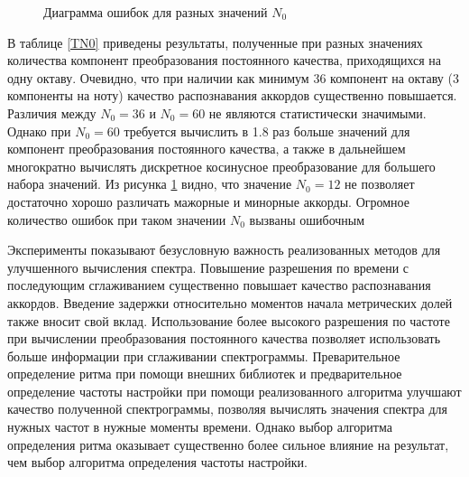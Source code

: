 \begin{figure}[h]
  \begin{minipage}[h]{0.49\linewidth}
  \end{minipage}
  \hfill
  \begin{minipage}[h]{0.49\linewidth}
  \end{minipage}
  \hfill
  \begin{minipage}[h]{0.49\linewidth}
  \end{minipage}
  \hfill
  \begin{minipage}[h]{0.49\linewidth}
  \end{minipage}
  \caption{Диаграмма ошибок для разных значений $N_0$}
  \label{img:n0}
\end{figure}

В таблице \ref{TN0} приведены результаты, полученные при разных значениях
количества компонент преобразования постоянного качества, приходящихся на одну
октаву. Очевидно, что при наличии как минимум 36 компонент на октаву (3
компоненты на ноту) качество распознавания аккордов существенно повышается.
Различия между $N_0=36$ и $N_0=60$ не являются статистически значимыми. Однако
при $N_0=60$ требуется вычислить в 1.8 раз больше значений для компонент
преобразования постоянного качества, а также в дальнейшем многократно вычислять
дискретное косинусное преобразование для большего набора значений. Из рисунка
\ref{img:n0} видно, что значение $N_0=12$ не позволяет достаточно хорошо
различать мажорные и минорные аккорды. Огромное количество ошибок при таком
значении $N_0$ вызваны ошибочным 

\medskip

Эксперименты показывают безусловную важность реализованных методов для
улучшенного вычисления спектра. Повышение разрешения по времени с последующим
сглаживанием существенно повышает качество распознавания аккордов. Введение
задержки относительно моментов начала метрических долей также вносит свой вклад.
Использование более высокого разрешения по частоте при вычислении преобразования
постоянного качества позволяет использовать больше информации при сглаживании
спектрограммы. Преварительное определение ритма при помощи внешних библиотек и
предварительное определение частоты настройки при помощи реализованного
алгоритма улучшают качество полученной спектрограммы, позволяя вычислять
значения спектра для нужных частот в нужные моменты времени. Однако выбор
алгоритма определения ритма оказывает существенно более сильное влияние на
результат, чем выбор алгоритма определения частоты настройки.

